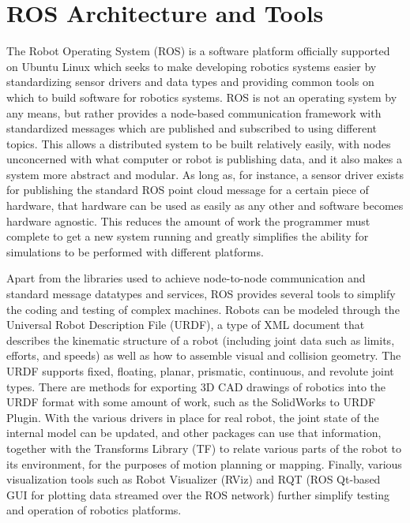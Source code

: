 \documentclass[12pt]{report}
\begin{document}
\section{ROS Architecture and Tools}
\label{sec:ros}
The Robot Operating System (ROS) is a software platform officially supported on Ubuntu Linux which seeks to make developing robotics systems easier by standardizing sensor drivers and data types and providing common tools on which to build software for robotics systems. \cite{rosPaper} ROS is not an operating system by any means, but rather provides a node-based communication framework with standardized messages which are published and subscribed to using different topics. This allows a distributed system to be built relatively easily, with nodes unconcerned with what computer or robot is publishing data, and it also makes a system more abstract and modular. As long as, for instance, a sensor driver exists for publishing the standard ROS point cloud message for a certain piece of hardware, that hardware can be used as easily as any other and software becomes hardware agnostic. This reduces the amount of work the programmer must complete to get a new system running and greatly simplifies the ability for simulations to be performed with different platforms.

Apart from the libraries used to achieve node-to-node communication and standard message datatypes and services, ROS provides several tools to simplify the coding and testing of complex machines. Robots can be modeled through the Universal Robot Description File (URDF), a type of XML document that describes the kinematic structure of a robot (including joint data such as limits, efforts, and speeds) as well as how to assemble visual and collision geometry. The URDF supports fixed, floating, planar, prismatic, continuous, and revolute joint types. There are methods for exporting 3D CAD drawings of robotics into the URDF format with some amount of work, such as the SolidWorks to URDF Plugin. \cite{urdfExporter} With the various drivers in place for real robot, the joint state of the internal model can be updated, and other packages can use that information, together with the Transforms Library (TF) to relate various parts of the robot to its environment, for the purposes of motion planning or mapping. Finally, various visualization tools such as Robot Visualizer (RViz) and RQT (ROS Qt-based GUI for plotting data streamed over the ROS network) further simplify testing and operation of robotics platforms.
\end{document}
